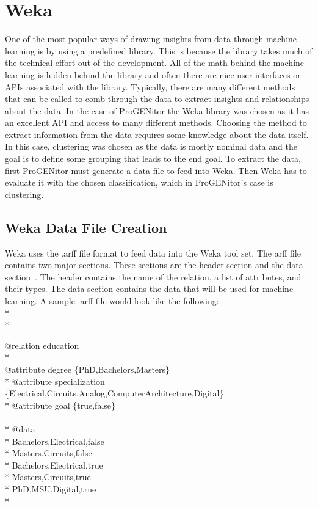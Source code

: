 \section{Weka}
\label{sect:weka}
One of the most popular ways of drawing insights from data through machine
learning is by using a predefined library.  This is because the library takes
much of the technical effort out of the development.  All of the math behind the
machine learning is hidden behind the library and often there are nice user
interfaces or APIs associated with the library.  Typically, there are many
different methods that can be called to comb through the data to extract
insights and relationships about the data.  In the case of ProGENitor the Weka
library was chosen as it has an excellent API and access to many different
methods.  Choosing the method to extract information from the data requires some
knowledge about the data itself.  In this case, clustering was chosen as the
data is mostly nominal data and the goal is to define some grouping that leads
to the end goal.  To extract the data, first ProGENitor must generate a data
file to feed into Weka.  Then Weka has to evaluate it with the chosen
classification, which in ProGENitor's case is clustering.

\subsection{Weka Data File Creation}
Weka uses the .arff file format to feed data into the Weka tool set.  The arff
file contains two major sections.  These sections are the header section and the
data section~\cite{arff}.  The header contains the name of the relation, a list
of attributes, and their types.  The data section contains the data that will
be used for machine learning.  A sample .arff file would look like the
following:\\*
\\*
\begin{tt}
\begin{footnotesize}
@relation education\\*
\\
@attribute degree \{PhD,Bachelors,Masters\}\\*
@attribute specialization
\{Electrical,Circuits,Analog,Computer\newline \indent Architecture,Digital\}\\*
@attribute goal \{true,false\}\\ \\* @data\\*
Bachelors,Electrical,false\\*
Masters,Circuits,false\\*
Bachelors,Electrical,true\\*
Masters,Circuits,true\\*
PhD,MSU,Digital,true\\*
\end{footnotesize}
\end{tt}

